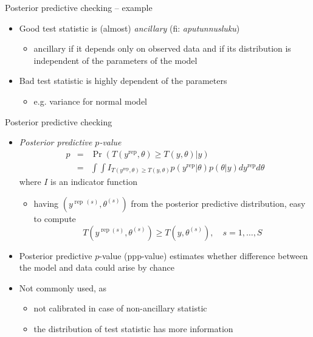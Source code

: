 \documentclass[t]{beamer}
\DeclareMathOperator{\rep}{\mathrm{rep}}
\begin{document}
\begin{frame}{Posterior predictive checking -- example}

  \begin{itemize}
  \item<1-> Good test statistic is (almost) \textit{ancillary} (fi: \textit{aputunnusluku})
    \begin{itemize}
    \item ancillary if it depends only on observed data and if its
      distribution is independent of the parameters of the model
    \end{itemize}
  \item<2-> Bad test statistic is highly dependent of the parameters
    \begin{itemize}
    \item e.g. variance for normal model
    \end{itemize}
  \end{itemize}
  \vspace{-1.5\baselineskip}

\end{frame}

\begin{frame}{Posterior predictive checking}

  \begin{itemize}
  \item<1-> \textit{Posterior predictive $p$-value}
    \begin{eqnarray*}
      p & = & \Pr(T(y^{\rep},\theta)\geq T(y,\theta)|y)\\
      & = & \int\int
      I_{T(y^{\rep},\theta)\geq T(y,\theta)}p(y^{\rep}|\theta)p(\theta|y)dy^{\rep}d\theta
    \end{eqnarray*}
    where $I$ is an indicator function
    \begin{itemize}
    \item<1->  having $(y^{\rep\,(s)},\theta^{(s)})$ from the posterior predictive
      distribution, easy to compute
      \begin{equation*}
        T(y^{\rep (s)},\theta^{(s)})\geq T(y,\theta^{(s)}), \quad s=1,\ldots,S
      \end{equation*}
    \end{itemize}
    \vspace{-1.5\baselineskip}
  \item<1-> Posterior predictive $p$-value (ppp-value) estimates whether
    difference between the model and data could arise by chance
  \item<1-> \color{black} Not commonly used, as
    \begin{itemize}
    \item not calibrated in case of non-ancillary statistic
    \item the distribution of test statistic has more information
    \end{itemize}
  \end{itemize}

\end{frame}
\end{document}
